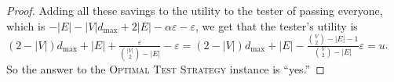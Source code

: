\documentclass{article}
\newtheorem{theorem}{Theorem}
\begin{document}
\begin{proof}
Adding all these savings to the utility to the tester of passing everyone,
which is  $-|E| -
|V|d_{\text{max}} + 2|E| - \alpha \varepsilon - \varepsilon$, 
we get that the tester's utility is $(2-|V|)d_{\text{max}} + |E| 
+ \frac{\varepsilon}{{|V| \choose 2} - |E|} -\varepsilon =
(2-|V|)d_{\text{max}} + |E| - \frac{{V  \choose 2}-|E|-1}{{V \choose
    2}-|E|}\varepsilon
= u$.
 So the
answer to the \textsc{Optimal Test Strategy} instance is ``yes.''
%
%
\end{proof}


%
\end{document}

